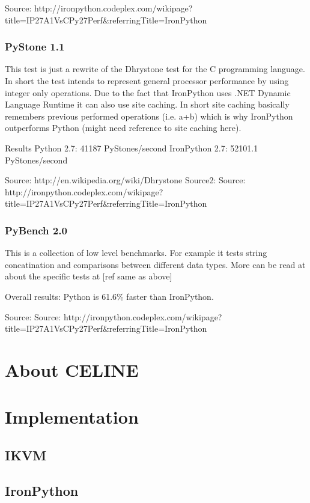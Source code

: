 Source: http://ironpython.codeplex.com/wikipage?title=IP27A1VsCPy27Perf&referringTitle=IronPython%

\subsubsection{PyStone 1.1}
This test is just a rewrite of the Dhrystone test for the C programming language. In short the test intends to represent general processor performance by using integer only operations. 
Due to the fact that IronPython uses .NET Dynamic Language Runtime it can also use site caching. In short site caching basically remembers previous performed operations (i.e. a+b) which is why IronPython outperforms Python (might need reference to site caching here). 

Results
Python 2.7: 41187 PyStones/second
IronPython 2.7: 52101.1 PyStones/second

Source: http://en.wikipedia.org/wiki/Dhrystone
Source2: Source: http://ironpython.codeplex.com/wikipage?title=IP27A1VsCPy27Perf&referringTitle=IronPython%

\subsubsection{PyBench 2.0}
This is a collection of low level benchmarks. For example it tests string concatination and comparisons between different data types. More can be read at about the specific tests at [ref same as above]

Overall results: Python is 61.6\% faster than IronPython.

Source: Source: http://ironpython.codeplex.com/wikipage?title=IP27A1VsCPy27Perf&referringTitle=IronPython%

\section{About CELINE}

\section{Implementation}

\subsection{IKVM}

\subsection{IronPython}

